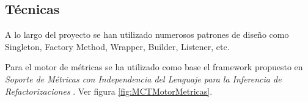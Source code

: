 \subsection{Técnicas}
A lo largo del proyecto se han utilizado numerosos patrones de diseño como Singleton, Factory Method, Wrapper, Builder, Listener, etc.

Para el motor de métricas se ha utilizado como base el framework propuesto en \textit{Soporte de Métricas con Independencia del Lenguaje para la Inferencia de Refactorizaciones} \cite{marticorena_soporte_2005}. Ver figura \ref{fig:MCTMotorMetricas}.

